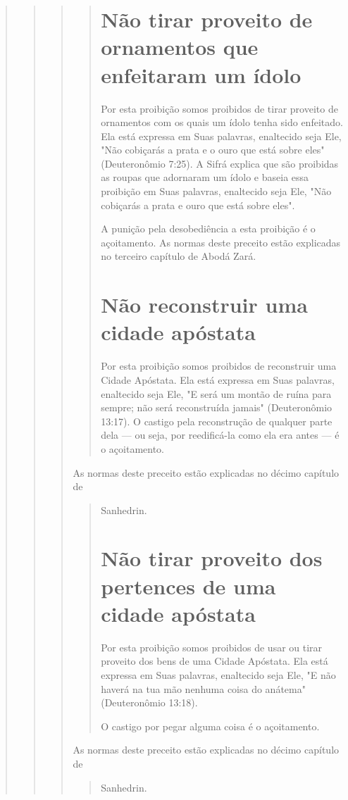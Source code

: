 \begin{quote}
\begin{quote}
\begin{quote}
\begin{quote}
\section{Não tirar proveito de ornamentos que enfeitaram um ídolo}

Por esta proibição somos proibidos de tirar proveito de ornamentos com
os quais um ídolo tenha sido enfeitado. Ela está expressa em Suas
pala­vras, enaltecido seja Ele, "Não cobiçarás a prata e o ouro que está
sobre eles" (Deuteronômio 7:25). A Sifrá explica que são proibidas as
roupas que adorna­ram um ídolo e baseia essa proibição em Suas palavras,
enaltecido seja Ele, "Não cobiçarás a prata e ouro que está sobre eles".

A punição pela desobediência a esta proibição é o açoitamento. As normas
deste preceito estão explicadas no terceiro capítulo de Abodá Zará.

\section{Não reconstruir uma cidade apóstata}

Por esta proibição somos proibidos de reconstruir uma Cidade Após­tata.
Ela está expressa em Suas palavras, enaltecido seja Ele, "E será um
montão de ruína para sempre; não será reconstruída jamais" (Deuteronômio
13:17). O castigo pela reconstrução de qualquer parte dela --- ou seja,
por reedificá-la co­mo ela era antes --- é o açoitamento.
\end{quote}

As normas deste preceito estão explicadas no décimo capítulo de

\begin{quote}
Sanhedrin.

\section{Não tirar proveito dos pertences de uma cidade apóstata}

Por esta proibição somos proibidos de usar ou tirar proveito dos bens de
uma Cidade Apóstata. Ela está expressa em Suas palavras, enaltecido seja
Ele, "E não haverá na tua mão nenhuma coisa do anátema" (Deuteronômio
13:18).

O castigo por pegar alguma coisa é o açoitamento.
\end{quote}

As normas deste preceito estão explicadas no décimo capítulo de

\begin{quote}
Sanhedrin.


\end{quote}
\end{quote}
\end{quote}
\end{quote}
